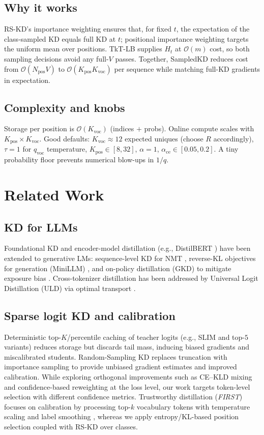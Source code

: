 \documentclass[11pt]{article}
\begin{document}
\subsection{Why it works}
RS-KD's importance weighting ensures that, for fixed $t$, the expectation of the class-sampled KD equals full KD at $t$; positional importance weighting targets the uniform mean over positions.
TkT-LB supplies $H_t$ at $\mathcal{O}(m)$ cost, so both sampling decisions avoid any full-$V$ passes.
Together, SampledKD reduces cost from $\mathcal{O}(N_{\text{pos}}V)$ to $\mathcal{O}(K_{\text{pos}}K_{\text{voc}})$ per sequence while matching full-KD gradients in expectation.

\subsection{Complexity and knobs}
Storage per position is $\mathcal{O}(K_{\text{voc}})$ (indices $+$ probs). Online compute scales with $K_{\text{pos}}\!\times\!K_{\text{voc}}$. Good defaults:
$K_{\text{voc}}\!\approx\!12$ expected uniques (choose $R$ accordingly),
$\tau{=}1$ for $q_{\text{voc}}$ temperature,
$K_{\text{pos}}\!\in\![8,32]$,
$\alpha{=}1$,
$\alpha_{\text{ce}}\!\in\![0.05,0.2]$.
A tiny probability floor prevents numerical blow-ups in $1/q$.


\section{Related Work}

\subsection{KD for LLMs} Foundational KD \citep{hinton2015distillation} and encoder-model distillation (e.g., DistilBERT \citep{sanh2019distilbert}) have been extended to generative LMs: sequence-level KD for NMT \citep{kim2016sequencekd}, reverse-KL objectives for generation (MiniLLM) \citep{gu2023minillm}, and on-policy distillation (GKD) to mitigate exposure bias \citep{agarwal2024gkd}. Cross-tokenizer distillation has been addressed by Universal Logit Distillation (ULD) via optimal transport \citep{boizard2024uld}.

\subsection{Sparse logit KD and calibration} 
Deterministic top-$K$/percentile caching of teacher logits (e.g., SLIM \citep{raman2023slim} and top-$5$ variants) reduces storage but discards tail mass, inducing biased gradients and miscalibrated students. 
Random-Sampling KD \citep{anshumann2025sparse} replaces truncation with importance sampling to provide unbiased gradient estimates and improved calibration.
While exploring orthogonal improvements such as CE--KLD mixing and confidence-based reweighting at the loss level, our work targets token-level selection with different confidence metrics.
Trustworthy distillation (\emph{FIRST}) focuses on calibration by processing top-$k$ vocabulary tokens with temperature scaling and label smoothing \citep{shum2024first}, whereas we apply entropy/KL-based position selection coupled with RS-KD over classes.
\end{document}
